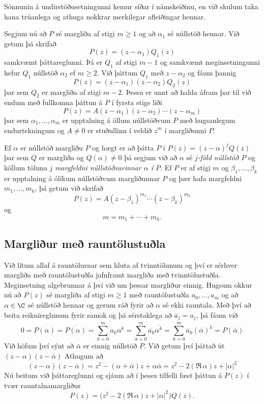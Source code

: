 \bigskip
Sönnunin á undirstöðusetningunni  kemur síðar í námskeiðinu, en við 
skulum taka hana  trúanlega  og athuga nokkrar merkilegar
afleiðingar hennar.   


Segjum nú að $P$  sé margliða af stigi $m\geq 1$
og að $\alpha_1$ sé núllstöð hennar.  Við getum þá skrifað
$$
P(z)=(z-\alpha_1)Q_1(z)
$$
samkvæmt þáttareglunni.  Þá er $Q_1$ af stigi $m-1$ og 
samkvæmt meginsetningunni hefur $Q_1$
núllstöð $\alpha_2$ ef $m\geq 2$. Við þáttum $Q_1$ með $z-\alpha_2$ og fáum þannig
$$
P(z)=(z-\alpha_1)(z-\alpha_2)Q_2(z)
$$ þar sem $Q_2$ er margliða af stigi
$m-2$.  Þessu er unnt að halda áfram þar til við endum með fullkomna
þáttun á $P$ í fyrsta stigs liði
$$
P(z)=A(z-\alpha_1)(z-\alpha_2)\cdots(z-\alpha_m)
$$
þar sem $\alpha_1,\dots,\alpha_m$ er upptalning á öllum núllstöðvum $P$
með hugsanlegum endurtekningum og $A\neq 0$ er stuðullinn í veldið
$z^m$ í margliðunni $P$.

Ef $\alpha$ er núllstöð margliðu $P$ og hægt er að þátta $P$
í $P(z)=(z-\alpha)^jQ(z)$ þar sem $Q$ er margliða og $Q(\alpha)\neq 0$
þá segjum við að $\alpha$ sé {\it $j$-föld núllstöð $P$} og köllum töluna
$j$ {\it margfeldni núllstöðvarinnar $\alpha$ í $P$}.  Ef $P$ er af
stigi $m$ og $\beta_1,\dots,\beta_k$ er upptalning á ólíkum
núllstöðvum margliðunnar $P$ og þær hafa margfeldni $m_1,\dots,m_k$,
þá getum við skrifað 
$$
P(z)=A(z-\beta_1)^{m_1}\cdots(z-\beta_k)^{m_k}
$$
og 
$$
m=m_1+\cdots+m_k.
$$


\subsection*{Margliður með rauntölustuðla}

Við lítum allaf á rauntölurnar sem hluta af tvinntölunum og því er
sérhver margliða með rauntölustuðla jafnframt margliða með
tvinntölustuðla.  Meginsetning algebrunnar á því við um þessar
margliður einnig. Hugsum okkur nú að  $P(z)$ sé margliða af stigi
$m\geq 1$ með rauntölustuðla $a_0,\dots,a_m$ og að $\alpha\in \C$ sé
núllstöð hennar og gerum ráð fyrir að $\alpha$ sé ekki rauntala.  
Með því að beita reiknireglunum fyrir samok og þá sérstaklega að 
$\bar a_j=a_j$, þá fáum við
\begin{equation*}
0=P(\alpha)=\overline{P(\alpha)}
=\overline{\sum_{k=0}^ma_k\alpha^k} =\sum_{k=0}^m \overline{a_k}\overline{\alpha^k}
=\sum_{k=0}^m a_k (\overline{\alpha})^k=P(\bar\alpha)
\end{equation*}
Við höfum því sýnt að $\bar \alpha$ er einnig núllstöð $P$. 
Við getum því þáttað út $(z-\alpha)(z-\bar \alpha)$
Athugum að 
$$
(z-\alpha)(z-\bar\alpha)=
z^2-(\alpha+\bar\alpha)z+\alpha\bar\alpha
=z^2-2(\Re\, \alpha)z+|\alpha|^2
$$
Nú beitum við þáttareglunni og sjáum að í þessu tilfelli fæst 
þáttun á $P(z)$ í tvær rauntalnamargliður
$$
P(z)=\big(z^2-2(\Re\, \alpha)z+|\alpha|^2\big)Q(z).
$$



